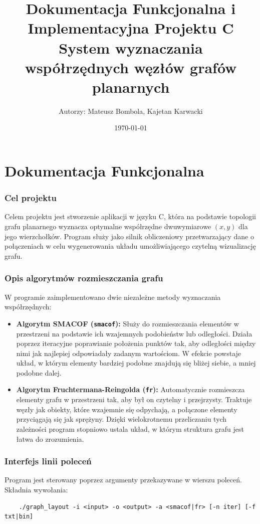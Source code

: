 \documentclass[12pt,a4paper]{article}
\title{Dokumentacja Funkcjonalna i Implementacyjna Projektu C\\ \large System wyznaczania współrzędnych węzłów grafów planarnych}
\author{Autorzy: Mateusz Bombola, Kajetan Karwacki}
\date{\today}
\begin{document}
\maketitle
\newpage
\tableofcontents
\newpage

\part{Dokumentacja Funkcjonalna}

\section{Cel projektu}
Celem projektu jest stworzenie aplikacji w języku C, która na podstawie topologii grafu planarnego wyznacza optymalne współrzędne dwuwymiarowe $(x, y)$ dla jego wierzchołków. Program służy jako silnik obliczeniowy przetwarzający dane o połączeniach w celu wygenerowania układu umożliwiającego czytelną wizualizację grafu.

\section{Opis algorytmów rozmieszczania grafu}
W programie zaimplementowano dwie niezależne metody wyznaczania współrzędnych:

\begin{itemize}
    \item \textbf{Algorytm SMACOF (\texttt{smacof}):} Służy do rozmieszczania elementów w przestrzeni na podstawie ich wzajemnych podobieństw lub odległości. Działa poprzez iteracyjne poprawianie położenia punktów tak, aby odległości między nimi jak najlepiej odpowiadały zadanym wartościom. W efekcie powstaje układ, w którym elementy bardziej podobne znajdują się bliżej siebie, a mniej podobne dalej.
    
    \item \textbf{Algorytm Fruchtermana-Reingolda (\texttt{fr}):} Automatycznie rozmieszcza elementy grafu w przestrzeni tak, aby był on czytelny i przejrzysty. Traktuje węzły jak obiekty, które wzajemnie się odpychają, a połączone elementy przyciągają się jak sprężyny. Dzięki wielokrotnemu przeliczaniu tych zależności program stopniowo ustala układ, w którym struktura grafu jest łatwa do zrozumienia.
\end{itemize}

\section{Interfejs linii poleceń}
Program jest sterowany poprzez argumenty przekazywane w wierszu poleceń. Składnia wywołania:
\begin{center}
    \begin{verbatim}
    ./graph_layout -i <input> -o <output> -a <smacof|fr> [-n iter] [-f txt|bin]
    \end{verbatim}
\end{center}
\end{document}

